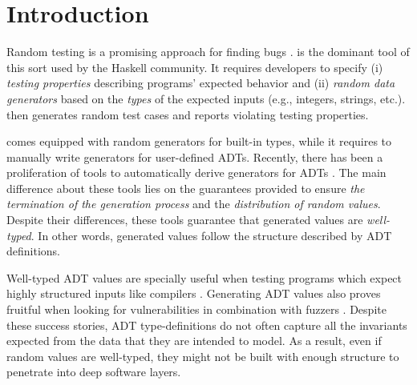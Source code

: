 \section{Introduction}

Random testing is a promising approach for finding bugs
\cite{HughesNSA16,HughesPAN16,ArtsHNS15}.
%
\quickcheck \cite{ClaessenH00} is the dominant tool of this sort used by the
Haskell community.
%
It requires developers to specify (i) \emph{testing properties} describing
programs' expected behavior and (ii) \emph{random data generators} based on the
\emph{types} of the expected inputs (e.g., integers, strings,
etc.). %
%
\quickcheck then generates random test cases and reports violating testing
properties.


\quickcheck comes equipped with random generators for built-in types, while it
requires to manually write generators for user-defined ADTs.
%
Recently, there has been a proliferation of tools to automatically derive
\quickcheck generators for ADTs
\cite{mitchell2007,RuncimanNL08,DuregardJW12,grieco2017,DBLP:conf/haskell/MistaRH18}.
%
The main difference about these tools lies on the guarantees provided to ensure
\emph{the termination of the generation process} and the \emph{distribution of
  random values}.
%
Despite their differences, these tools guarantee that generated values are
\emph{well-typed}.
%
In other words, generated values follow the structure described by ADT
definitions.


Well-typed ADT values are specially useful when testing programs which expect
highly structured inputs like compilers
\cite{Palka11,MidtgaardJKNN17,klein2009randomized}.
%
Generating ADT values also proves fruitful when looking for vulnerabilities in
combination with fuzzers \cite{GriecoCB16,grieco2017}.
%
%
Despite these success stories, ADT type-definitions do not often capture all the
invariants expected from the data that they are intended to model.
%
As a result, even if random values are well-typed, they might not be built with
enough structure to penetrate into deep software layers.



